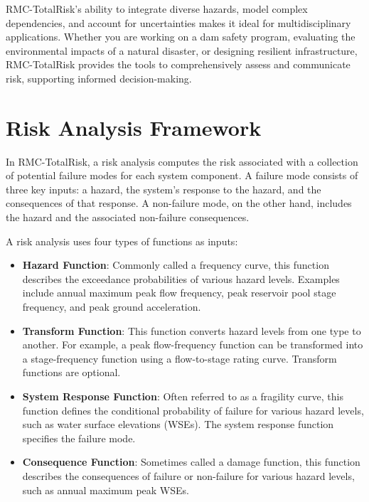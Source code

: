 \documentclass[
]{book}
\begin{document}
RMC-TotalRisk's ability to integrate diverse hazards, model complex dependencies, and account for uncertainties makes it ideal for multidisciplinary applications. Whether you are working on a dam safety program, evaluating the environmental impacts of a natural disaster, or designing resilient infrastructure, RMC-TotalRisk provides the tools to comprehensively assess and communicate risk, supporting informed decision-making.

\hypertarget{risk-analysis-framework}{%
\chapter{Risk Analysis Framework}\label{risk-analysis-framework}}

In RMC-TotalRisk, a risk analysis computes the risk associated with a collection of potential failure modes for each system component. A failure mode consists of three key inputs: a hazard, the system's response to the hazard, and the consequences of that response. A non-failure mode, on the other hand, includes the hazard and the associated non-failure consequences.

A risk analysis uses four types of functions as inputs:

\begin{itemize}
\item
  \textbf{Hazard Function}: Commonly called a frequency curve, this function describes the exceedance probabilities of various hazard levels. Examples include annual maximum peak flow frequency, peak reservoir pool stage frequency, and peak ground acceleration.
\item
  \textbf{Transform Function}: This function converts hazard levels from one type to another. For example, a peak flow-frequency function can be transformed into a stage-frequency function using a flow-to-stage rating curve. Transform functions are optional.
\item
  \textbf{System Response Function}: Often referred to as a fragility curve, this function defines the conditional probability of failure for various hazard levels, such as water surface elevations (WSEs). The system response function specifies the failure mode.
\item
  \textbf{Consequence Function}: Sometimes called a damage function, this function describes the consequences of failure or non-failure for various hazard levels, such as annual maximum peak WSEs.
\end{itemize}
\end{document}
